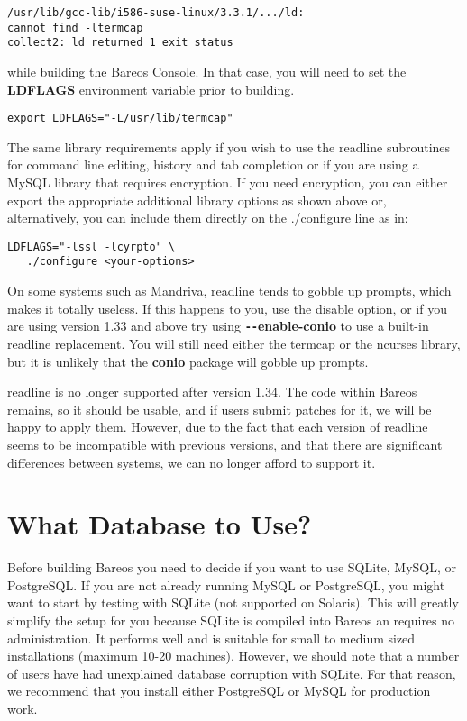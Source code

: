 \footnotesize
\begin{verbatim}
/usr/lib/gcc-lib/i586-suse-linux/3.3.1/.../ld:
cannot find -ltermcap
collect2: ld returned 1 exit status
\end{verbatim}
\normalsize

while building the Bareos Console. In that case, you will need to set the {\bf
LDFLAGS} environment variable prior to building.

\footnotesize
\begin{verbatim}
export LDFLAGS="-L/usr/lib/termcap"
\end{verbatim}
\normalsize

The same library requirements apply if you wish to use the readline subroutines
for command line editing, history and tab completion or if you are using a
MySQL library that requires encryption. If you need encryption, you can either
export the appropriate additional library options as shown above or,
alternatively, you can include them directly on the ./configure line as in:

\footnotesize
\begin{verbatim}
LDFLAGS="-lssl -lcyrpto" \
   ./configure <your-options>
\end{verbatim}
\normalsize

On some systems such as Mandriva, readline tends to
gobble up prompts, which makes it totally useless. If this happens to you, use
the disable option, or if you are using version 1.33 and above try using {\bf
\verb:--:enable-conio} to use a built-in readline replacement. You will still need
either the termcap or the ncurses library, but it is unlikely that the {\bf conio}
package will gobble up prompts.

readline is no longer supported after version 1.34.  The code within Bareos
remains, so it should be usable, and if users submit patches for it, we will
be happy to apply them.  However, due to the fact that each version of
readline seems to be incompatible with previous versions, and that there
are significant differences between systems, we can no longer afford to
support it.

\section{What Database to Use?}
\label{DB}

Before building Bareos you need to decide if you want to use SQLite, MySQL, or
PostgreSQL. If you are not already running MySQL or PostgreSQL, you might
want to start by testing with SQLite (not supported on Solaris).
This will greatly simplify the setup for you
because SQLite is compiled into Bareos an requires no administration. It
performs well and is suitable for small to medium sized installations (maximum
10-20 machines). However, we should note that a number of users have
had unexplained database corruption with SQLite. For that reason, we
recommend that you install either PostgreSQL or MySQL for production
work.

